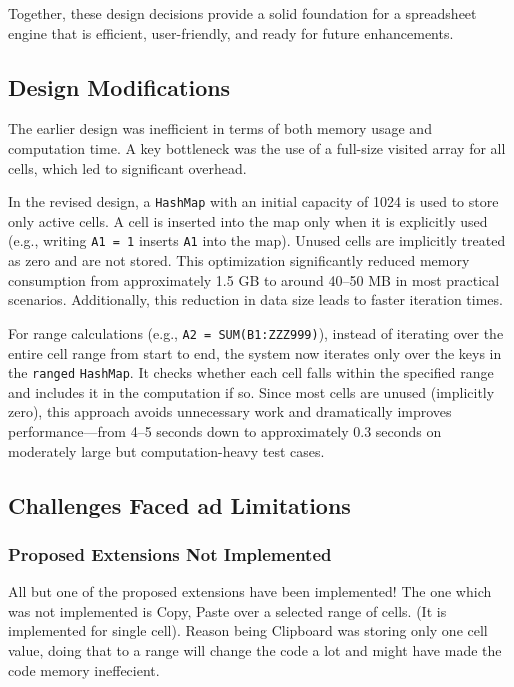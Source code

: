\documentclass{article}
\begin{document}
Together, these design decisions provide a solid foundation for a spreadsheet engine that is efficient, user-friendly, and ready for future enhancements.

\subsection{Design Modifications}
\label{sec:modifications}

The earlier design was inefficient in terms of both memory usage and computation time. A key bottleneck was the use of a full-size visited array for all cells, which led to significant overhead.

In the revised design, a \texttt{HashMap} with an initial capacity of 1024 is used to store only active cells. A cell is inserted into the map only when it is explicitly used (e.g., writing \texttt{A1 = 1} inserts \texttt{A1} into the map). Unused cells are implicitly treated as zero and are not stored. This optimization significantly reduced memory consumption from approximately 1.5 GB to around 40--50 MB in most practical scenarios. Additionally, this reduction in data size leads to faster iteration times.

For range calculations (e.g., \texttt{A2 = SUM(B1:ZZZ999)}), instead of iterating over the entire cell range from start to end, the system now iterates only over the keys in the \texttt{ranged} \texttt{HashMap}. It checks whether each cell falls within the specified range and includes it in the computation if so. Since most cells are unused (implicitly zero), this approach avoids unnecessary work and dramatically improves performance—from 4--5 seconds down to approximately 0.3 seconds on moderately large but computation-heavy test cases.


\subsection{Challenges Faced ad Limitations}
\label{sec:modifications}
\subsubsection{Proposed Extensions Not Implemented}
\label{sec:limitations}
All but one of the proposed extensions have been implemented! The one which was not implemented is Copy, Paste over a selected range of cells. (It is implemented for single cell).
Reason being Clipboard was storing only one cell value, doing that to a range will change the code a lot and might have made the code memory ineffecient.
\end{document}

